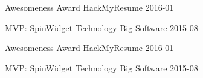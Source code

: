 




\begin{cvhonors}

  \cvhonor
    {Awesomeness Award} %
    {HackMyResume} %
    {} %
    {2016-01} %


  \cvhonor
    {MVP: SpinWidget Technology} %
    {Big Software} %
    {} %
    {2015-08} %


\end{cvhonors}




\begin{cvhonors}

  \cvhonor
  {Awesomeness Award} %
  {HackMyResume} %
  {} %
  {2016-01} %


  \cvhonor
  {MVP: SpinWidget Technology} %
  {Big Software} %
  {} %
  {2015-08} %


\end{cvhonors}

